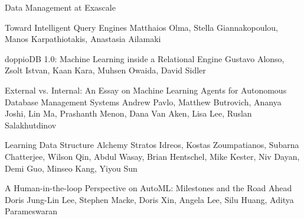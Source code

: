 \documentclass[11pt]{article}
\begin{document}
\begin{bulletin}
\begin{articlesection}{Data Management at Exascale}
%
%
%
\begin{article}
{Toward Intelligent Query Engines}
{Matthaios Olma,  Stella Giannakopoulou,  Manos Karpathiotakis, Anastasia Ailamaki}
\graphicspath{{submissions/adaptivedb/}}

\end{article}


\begin{article}
{doppioDB 1.0: Machine Learning inside a Relational Engine}
{Gustavo Alonso, Zsolt Istvan, Kaan Kara, Muhsen Owaida, David Sidler}
\graphicspath{{submissions/gustavo/}}

\end{article}


\begin{article}
{External vs. Internal: An Essay on  Machine Learning Agents for  Autonomous Database Management Systems}
{Andrew Pavlo, Matthew Butrovich, Ananya Joshi, Lin Ma, Prashanth 
Menon, Dana Van Aken, Lisa Lee, Ruslan Salakhutdinov}
\graphicspath{{submissions/selfdriving/}}

\end{article}



\begin{article}
{Learning Data Structure Alchemy}
{Stratos Idreos, 
Kostas Zoumpatianos, 
Subarna Chatterjee, 
Wilson Qin,
Abdul Wasay,
Brian Hentschel, 
Mike Kester,
Niv Dayan,
Demi Guo,
Minseo Kang,
Yiyou Sun
}
\graphicspath{{submissions/Learning/}}

\end{article}



\begin{article}
{A Human-in-the-loop Perspective on AutoML: Milestones and the Road Ahead}
{Doris Jung-Lin Lee, Stephen Macke, Doris Xin, Angela Lee, Silu Huang, Aditya Parameswaran}
\graphicspath{{submissions/automl/}}

\end{article}


\end{articlesection}
\end{bulletin}
\end{document}

